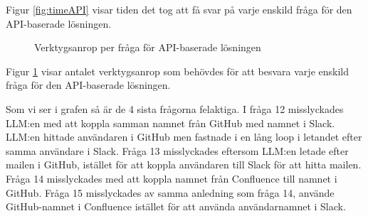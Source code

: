 Figur \ref{fig:timeAPI} visar tiden det tog att få svar på varje enskild fråga för den API-baserade lösningen.

\begin{figure}[H]
\centering
{}
\caption{Verktygsanrop per fråga för API-baserade lösningen}
\label{fig:toolCallsAPI}
\end{figure}

Figur \ref{fig:toolCallsAPI} visar antalet verktygsanrop som behövdes för att besvara varje enskild fråga för den API-baserade lösningen.




Som vi ser i grafen så är de 4 sista frågorna felaktiga.
I fråga 12 misslyckades LLM:en med att koppla samman namnet från GitHub med namnet i Slack. LLM:en hittade användaren i GitHub men fastnade i en lång loop i letandet efter samma användare i Slack.
Fråga 13 misslyckades eftersom LLM:en letade efter mailen i GitHub, istället för att koppla användaren till Slack för att hitta mailen.
Fråga 14 misslyckades med att koppla namnet från Confluence till namnet i GitHub.
Fråga 15 misslyckades av samma anledning som fråga 14, använde GitHub-namnet i Confluence istället för att använda användarnamnet i Slack.

